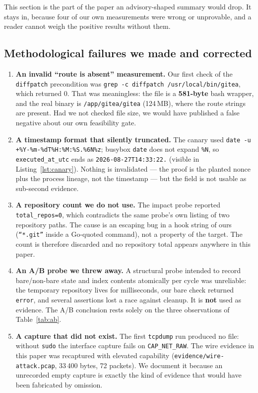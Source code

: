 This section is the part of the paper an advisory-shaped summary would drop.
It stays in, because four of our own measurements were wrong or unprovable,
and a reader cannot weigh the positive results without them.

\subsection{Methodological failures we made and corrected}
\label{sec:negative}

\begin{enumerate}
\item \textbf{An invalid ``route is absent'' measurement.} Our first check of
the \texttt{diffpatch} precondition was
\texttt{grep -c diffpatch /usr/local/bin/gitea}, which returned 0. That was
meaningless: the file is a \textbf{581-byte} bash wrapper, and the real binary
is \texttt{/app/gitea/gitea} (124\,MB), where the route strings are present.
Had we not checked file size, we would have published a false negative about
our own feasibility gate.
\item \textbf{A timestamp format that silently truncated.} The canary used
\texttt{date -u +\%Y-\%m-\%dT\%H:\%M:\%S.\%6N\%z}; busybox \texttt{date} does
not expand \texttt{\%N}, so \texttt{executed\_at\_utc} ends as
\texttt{2026-08-27T14:33:22.} (visible in Listing~\ref{lst:canary}). Nothing
is invalidated --- the proof is the planted nonce plus the process lineage,
not the timestamp --- but the field is not usable as sub-second evidence.
\item \textbf{A repository count we do not use.} The impact probe reported
\texttt{total\_repos=0}, which contradicts the same probe's own listing of
two repository paths. The cause is an escaping bug in a hook string of ours
(\texttt{``*.git''} inside a Go-quoted command), not a property of the target.
The count is therefore discarded and no repository total appears anywhere in
this paper.
\item \textbf{An A/B probe we threw away.} A structural probe intended to
record bare/non-bare state and index contents atomically per cycle was
unreliable: the temporary repository lives for milliseconds, our bare check
returned \texttt{error}, and several assertions lost a race against cleanup.
It is \textbf{not} used as evidence. The A/B conclusion rests solely on the
three observations of Table~\ref{tab:ab}.
\item \textbf{A capture that did not exist.} The first \texttt{tcpdump} run
produced no file: without \texttt{sudo} the interface capture fails on
\texttt{CAP\_NET\_RAW}. The wire evidence in this paper was recaptured with
elevated capability (\texttt{evidence/wire-attack.pcap}, 33\,400 bytes, 72
packets). We document it because an unrecorded empty capture is exactly the
kind of evidence that would have been fabricated by omission.
\end{enumerate}

